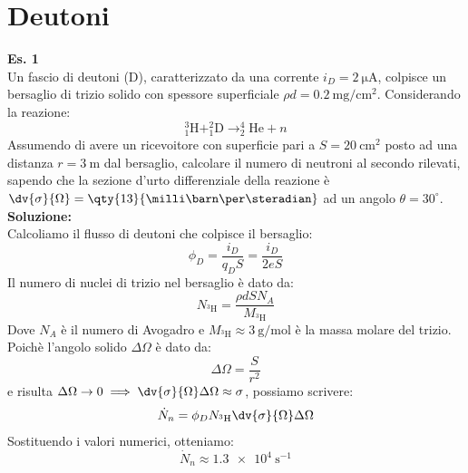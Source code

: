 \section{Deutoni}
\textbf{Es. 1}\\
Un fascio di deutoni (D), caratterizzato da una corrente $i_D = \qty{2}{\micro\ampere}$, colpisce un bersaglio di trizio solido con spessore superficiale $\rho d = \qty{0.2}{\milli\gram\per\centi\meter^2}$. Considerando la reazione:
\begin{equation}
 ^3_1\text{H} + ^2_1\text{D} \rightarrow ^4_2\text{He} + n
\end{equation}
Assumendo di avere un ricevoitore con superficie pari a $S=\qty{20}{\centi\meter^2}$ posto ad una distanza $r=\qty{3}{\meter}$ dal bersaglio, calcolare il numero di neutroni al secondo rilevati, sapendo che la sezione d'urto differenziale della reazione è $\dv{\sigma}{\Omega} = \qty{13}{\milli\barn\per\steradian}$ ad un angolo $\theta = 30^\circ$.\\
\textbf{Soluzione:}\\
Calcoliamo il flusso di deutoni che colpisce il bersaglio:
\begin{equation}
 \phi_D = \dfrac{i_D}{q_D S} = \dfrac{i_D}{2e S}
\end{equation}
Il numero di nuclei di trizio nel bersaglio è dato da:
\begin{equation}
 N_{^3\text{H}} = \dfrac{\rho d S N_A}{M_{^3\text{H}}}
\end{equation}
Dove $N_A$ è il numero di Avogadro e $M_{^3\text{H}} \approx \qty{3}{\gram\per\mole}$ è la massa molare del trizio.\\
Poichè l'angolo solido $\Delta \Omega$ è dato da:
\begin{equation}
 \Delta \Omega = \dfrac{S}{r^2}
\end{equation}
e risulta $\Delta \Omega \rightarrow 0 \implies \dv{\sigma}{\Omega} \Delta \Omega \approx \sigma$, possiamo scrivere:
\begin{equation}
  \dot{N}_n = \phi_D N_{^3\text{H}} \dv{\sigma}{\Omega} \Delta \Omega
\end{equation}
Sostituendo i valori numerici, otteniamo:
\begin{equation}
 \dot{N}_n \approx \qty{1.3e4}{\second^{-1}}
\end{equation}
